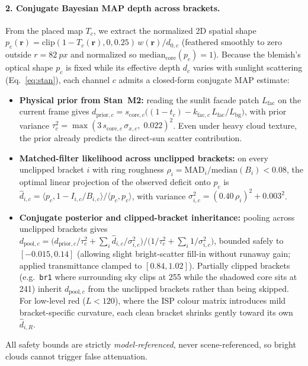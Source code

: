 \documentclass[11pt,a4paper]{article}
\newcommand{\Lbg}{L_{\mathrm{bg}}}
\newcommand{\Lfac}{L_{\mathrm{fac}}}
\newcommand{\code}[1]{\texttt{\small #1}}
\begin{document}
\paragraph{2. Conjugate Bayesian MAP depth across brackets.}
From the placed map $T_c$, we extract the normalized 2D spatial shape
$p_c(\mathbf{r}) = \mathrm{clip}(1 - T_c(\mathbf{r}), 0, 0.25)\,w(\mathbf{r}) / d_{0,c}$
(feathered smoothly to zero outside $r = \SI{82}{px}$ and normalized so
$\mathrm{median}_{\mathrm{core}}(p_c) = 1$). Because the blemish's optical shape
$p_c$ is fixed while its effective depth $d_c$ varies with sunlight scattering
(Eq.~\eqref{eq:stan}), each channel $c$ admits a closed-form conjugate MAP estimate:
\begin{itemize}
\item \textbf{Physical prior from Stan~M2:} reading the sunlit facade patch $\Lfac$ on
  the current frame gives
  $d_{\mathrm{prior},c} = s_{\mathrm{core},c}\bigl((1 - t_c) - k_{\mathrm{fac},c}\,\Lfac/\Lbg\bigr)$,
  with prior variance $\tau_c^2 = \max(3\,s_{\mathrm{core},c}\,\sigma_{x,c},\; 0.022)^2$.
  Even under heavy cloud texture, the prior already predicts the direct-sun scatter
  contribution.
\item \textbf{Matched-filter likelihood across unclipped brackets:} on every unclipped
  bracket $i$ with ring roughness $\rho_i = \mathrm{MAD}_i/\mathrm{median}(B_i) < 0.08$,
  the optimal linear projection of the observed deficit onto $p_c$ is
  $\hat d_{i,c} = \langle p_c, 1 - I_{i,c}/B_{i,c}\rangle / \langle p_c, p_c\rangle$,
  with variance $\sigma_{i,c}^2 = (0.40\,\rho_i)^2 + 0.003^2$.
\item \textbf{Conjugate posterior and clipped-bracket inheritance:} pooling across
  unclipped brackets gives
  $d_{\mathrm{pool},c} = \bigl(d_{\mathrm{prior},c}/\tau_c^2 + \sum_i \hat d_{i,c}/\sigma_{i,c}^2\bigr) / \bigl(1/\tau_c^2 + \sum_i 1/\sigma_{i,c}^2\bigr)$,
  bounded safely to $[-0.015, 0.14]$ (allowing slight bright-scatter fill-in without
  runaway gain; applied transmittance clamped to $[0.84, 1.02]$). Partially clipped
  brackets (e.g.\ \code{br1} where surrounding sky clips at 255 while the shadowed core
  sits at 241) inherit $d_{\mathrm{pool},c}$ from the unclipped brackets rather than
  being skipped. For low-level red ($L < 120$), where the ISP colour matrix introduces
  mild bracket-specific curvature, each clean bracket shrinks gently toward its own
  $\hat d_{i,R}$.
\end{itemize}
All safety bounds are strictly \emph{model-referenced}, never scene-referenced, so
bright clouds cannot trigger false attenuation.
\end{document}

